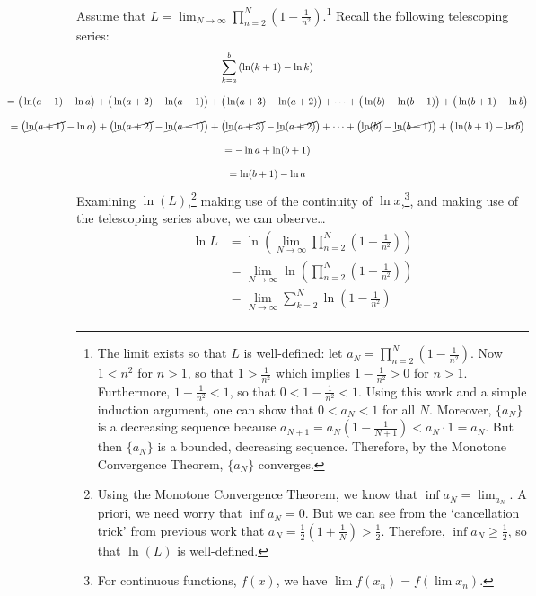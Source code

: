 \documentclass[11pt,letterpaper]{article}
\begin{document}
\begin{enumerate}
Assume that $\displaystyle L= \lim_{N \to \infty} \prod_{n=2}^N \left(1 - \frac{1}{n^2} \right)$.\footnote{The limit exists so that $L$ is well-defined: let $a_N= \prod_{n=2}^N \left(1 - \frac{1}{n^2} \right)$. Now $1 < n^2$ for $n > 1$, so that $1> \frac{1}{n^2}$ which implies $1- \frac{1}{n^2} > 0$ for $n > 1$. Furthermore, $1 - \frac{1}{n^2} < 1$, so that $0 < 1 - \frac{1}{n^2} < 1$. Using this work and a simple induction argument, one can show that $0 < a_N < 1$ for all $N$. Moreover, $\{ a_N \}$ is a decreasing sequence because $a_{N + 1}= a_N \left(1 - \frac{1}{N + 1} \right) < a_N \cdot 1= a_N$. But then $\{ a_N \}$ is a bounded, decreasing sequence. Therefore, by the Monotone Convergence Theorem, $\{ a_N \}$ converges.} Recall the following telescoping series:
	\[
	\hspace{-2.5cm}
	\begin{gathered}
	\sum_{k=a}^b \left( \ln(k + 1) - \ln k \right) \\[0.3cm]
	=\big( \ln(a + 1) - \ln a \big) + \big( \ln(a + 2) - \ln(a + 1) \big) + \big( \ln(a + 3) - \ln(a + 2) \big) + \cdots + \big( \ln(b) - \ln(b - 1) \big) + \big( \ln(b + 1) - \ln b \big) \\[0.3cm]
	=\big( \cancel{\ln(a + 1)} - \ln a \big) + \big( \cancel{\ln(a + 2)} - \cancel{\ln(a + 1)} \big) + \big( \cancel{\ln(a + 3)} - \cancel{\ln(a + 2)} \big) + \cdots + \big( \cancel{\ln(b)} - \cancel{\ln(b - 1)} \big) + \big( \ln(b + 1) - \cancel{\ln b} \big) \\[0.3cm]
	= -\ln a + \ln(b + 1) \\[0.3cm]
	= \ln(b + 1) - \ln a
	\end{gathered}
	\]
Examining $\ln(L)$,\footnote{Using the Monotone Convergence Theorem, we know that $\inf a_N= \lim_{a_N}$. A priori, we need worry that $\inf a_N= 0$. But we can see from the `cancellation trick' from previous work that $a_N= \frac{1}{2} \left(1 + \frac{1}{N} \right) > \frac{1}{2}$. Therefore, $\inf a_N \geq \frac{1}{2}$, so that $\ln(L)$ is well-defined.} making use of the continuity of $\ln x$,\footnote{For continuous functions, $f(x)$, we have $\lim f(x_n)= f( \lim x_n)$.}, and making use of the telescoping series above, we can observe\dots
	\[
	\begin{aligned}
	\ln L&= \ln \left( \lim_{N \to \infty} \prod_{n=2}^N \left(1 - \frac{1}{n^2} \right) \right) \\
	&= \lim_{N \to \infty} \ln \left( \prod_{n=2}^N \left(1 - \frac{1}{n^2} \right) \right) \\
	&= \lim_{N \to \infty} \sum_{k=2}^N \ln \left(1 - \frac{1}{n^2} \right) \\

\end{aligned}\]
\end{enumerate}
\end{document}
